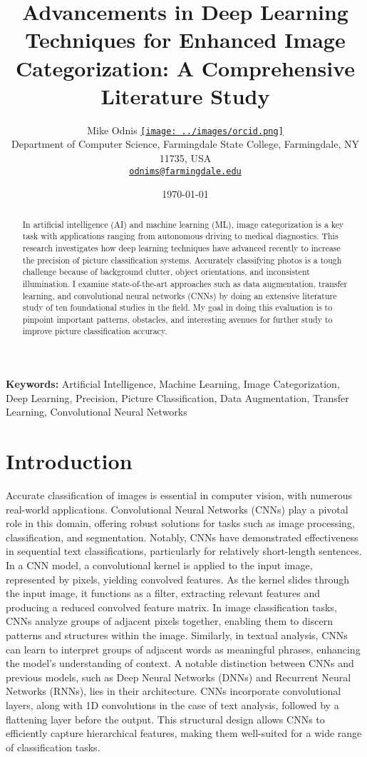 \documentclass[journal, biblatex]{IEEEtran}
\title{Advancements in Deep Learning Techniques for Enhanced Image Categorization: A Comprehensive Literature Study}
\author{%
    \begin{tabular}[t]{@{}c@{}}
        Mike Odnis \href{https://orcid.org/0009-0004-4785-1336}{\texttt{[image: ../images/orcid.png]}} \\
        \vspace{-1ex}
        \large Department of Computer Science, Farmingdale State College, Farmingdale, NY 11735, USA \\
        \texttt{\small{\href{mailto:odnims@farmingdale.edu}{\underline{\color{blue}odnims@farmingdale.edu}}}}
    \end{tabular}
}
\date{\today}
\begin{document}
\maketitle

\begin{abstract}
In artificial intelligence (AI) and machine learning (ML), image categorization is a key task with applications ranging from autonomous driving to medical diagnostics. This research investigates how deep learning techniques have advanced recently to increase the precision of picture classification systems. Accurately classifying photos is a tough challenge because of background clutter, object orientations, and inconsistent illumination. I examine state-of-the-art approaches such as data augmentation, transfer learning, and convolutional neural networks (CNNs) by doing an extensive literature study of ten foundational studies in the field. My goal in doing this evaluation is to pinpoint important patterns, obstacles, and interesting avenues for further study to improve picture classification accuracy.
\end{abstract}

\textbf{Keywords:} Artificial Intelligence, Machine Learning, Image Categorization, Deep Learning, Precision, Picture Classification, Data Augmentation, Transfer Learning, Convolutional Neural Networks

\section{Introduction}
Accurate classification of images is essential in computer vision, with numerous real-world applications. Convolutional Neural Networks (CNNs) play a pivotal role in this domain, offering robust solutions for tasks such as image processing, classification, and segmentation. Notably, CNNs have demonstrated effectiveness in sequential text classifications, particularly for relatively short-length sentences. In a CNN model, a convolutional kernel is applied to the input image, represented by pixels, yielding convolved features. As the kernel slides through the input image, it functions as a filter, extracting relevant features and producing a reduced convolved feature matrix. In image classification tasks, CNNs analyze groups of adjacent pixels together, enabling them to discern patterns and structures within the image. Similarly, in textual analysis, CNNs can learn to interpret groups of adjacent words as meaningful phrases, enhancing the model's understanding of context. A notable distinction between CNNs and previous models, such as Deep Neural Networks (DNNs) and Recurrent Neural Networks (RNNs), lies in their architecture. CNNs incorporate convolutional layers, along with 1D convolutions in the case of text analysis, followed by a flattening layer before the output. This structural design allows CNNs to efficiently capture hierarchical features, making them well-suited for a wide range of classification tasks.
\end{document}
